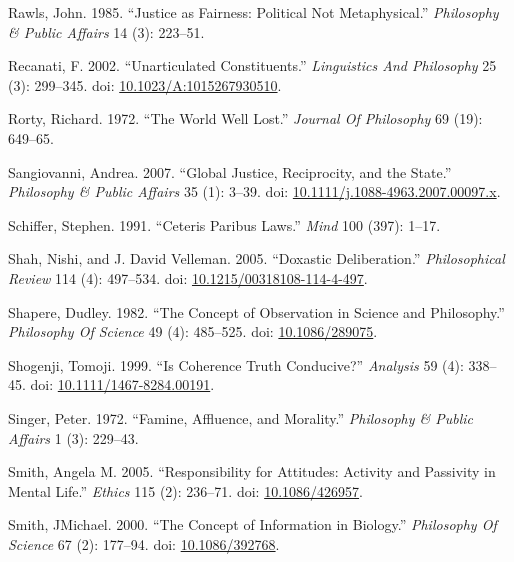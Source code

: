 \documentclass[
  10pt,
  letterpaper,
  DIV=11,
  numbers=noendperiod,
  twoside]{scrartcl}
\newlength{\cslhangindent}
\newenvironment{CSLReferences}[2] %
 {\begin{list}{}{%
  \setlength{\itemindent}{0pt}
  \setlength{\leftmargin}{0pt}
  \setlength{\parsep}{0pt}
  \ifodd #1
   \setlength{\leftmargin}{\cslhangindent}
   \setlength{\itemindent}{-1\cslhangindent}
  \fi
  \setlength{\itemsep}{#2\baselineskip}}}
 {\end{list}}
\begin{document}
\begin{CSLReferences}{1}{0}
Rawls, John. 1985. {``Justice as Fairness: Political Not
Metaphysical.''} \emph{Philosophy \& Public Affairs} 14 (3): 223--51.

Recanati, F. 2002. {``Unarticulated Constituents.''} \emph{Linguistics
And Philosophy} 25 (3): 299--345. doi:
\href{https://doi.org/10.1023/A:1015267930510}{10.1023/A:1015267930510}.

Rorty, Richard. 1972. {``The World Well Lost.''} \emph{Journal Of
Philosophy} 69 (19): 649--65.

Sangiovanni, Andrea. 2007. {``Global Justice, Reciprocity, and the
State.''} \emph{Philosophy \& Public Affairs} 35 (1): 3--39. doi:
\href{https://doi.org/10.1111/j.1088-4963.2007.00097.x}{10.1111/j.1088-4963.2007.00097.x}.

Schiffer, Stephen. 1991. {``Ceteris Paribus Laws.''} \emph{Mind} 100
(397): 1--17.

Shah, Nishi, and J. David Velleman. 2005. {``Doxastic Deliberation.''}
\emph{Philosophical Review} 114 (4): 497--534. doi:
\href{https://doi.org/10.1215/00318108-114-4-497}{10.1215/00318108-114-4-497}.

Shapere, Dudley. 1982. {``The Concept of Observation in Science and
Philosophy.''} \emph{Philosophy Of Science} 49 (4): 485--525. doi:
\href{https://doi.org/10.1086/289075}{10.1086/289075}.

Shogenji, Tomoji. 1999. {``Is Coherence Truth Conducive?''}
\emph{Analysis} 59 (4): 338--45. doi:
\href{https://doi.org/10.1111/1467-8284.00191}{10.1111/1467-8284.00191}.

Singer, Peter. 1972. {``Famine, Affluence, and Morality.''}
\emph{Philosophy \& Public Affairs} 1 (3): 229--43.

Smith, Angela M. 2005. {``Responsibility for Attitudes: Activity and
Passivity in Mental Life.''} \emph{Ethics} 115 (2): 236--71. doi:
\href{https://doi.org/10.1086/426957}{10.1086/426957}.

Smith, JMichael. 2000. {``The Concept of Information in Biology.''}
\emph{Philosophy Of Science} 67 (2): 177--94. doi:
\href{https://doi.org/10.1086/392768}{10.1086/392768}.


\end{CSLReferences}
\end{document}
